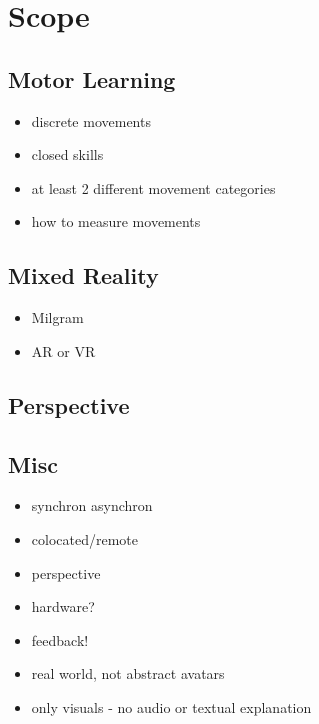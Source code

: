 \chapter{Scope}
\section{Motor Learning}
\begin{itemize}
	\item discrete movements
	\item closed skills
	\item at least 2 different movement categories
	\item how to measure movements
\end{itemize}

\section{Mixed Reality}
\begin{itemize}
	\item Milgram
	\item AR or VR
\end{itemize}

\section{Perspective}


\section{Misc}
\begin{itemize}
	\item synchron asynchron
	\item colocated/remote
	\item perspective
	\item hardware?
	\item feedback!
	\item real world, not abstract avatars
	\item only visuals - no audio or textual explanation
\end{itemize}